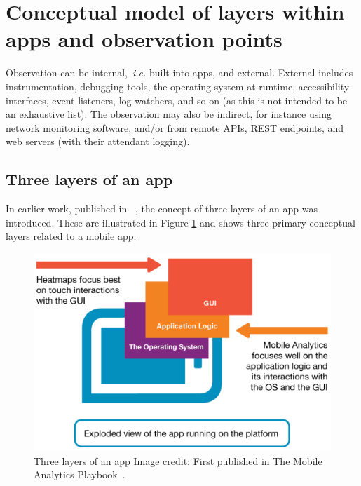 \section{Conceptual model of layers within apps and observation points}
Observation can be internal,~\emph{i.e.} built into apps, and external. External includes instrumentation, debugging tools, the operating system at runtime, accessibility interfaces, event listeners, log watchers, and so on (as this is not intended to be an exhaustive list). The observation may also be indirect, for instance using network monitoring software, and/or from remote APIs, REST endpoints, and web servers (with their attendant logging).

\subsection{Three layers of an app}
In earlier work, published in ~, the concept of three layers of an app was introduced. These are illustrated in Figure \ref{fig:3-layers} and shows three primary conceptual layers related to a mobile app. 


\begin{figure}
    \includegraphics[width=\linewidth]{images/mobile-analytics-playbook/3-layers.pdf}
    \caption[Three layers of an app]{Three layers of an app {Image credit: First published in The Mobile Analytics Playbook~\cite{harty_aymer_playbook_2016}}.}
    \label{fig:3-layers}
\end{figure}

